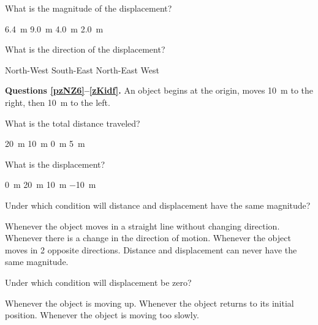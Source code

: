 \documentclass[answers]{exam}
\begin{document}
\begin{questions}
\ifprintanswers
\else
\clearpage
\fi

\question
What is the magnitude of the displacement?
\begin{randomizechoices}
    \correctchoice \SI{6.4}{m}
    \choice \SI{9.0}{m}
    \choice \SI{4.0}{m}
    \choice \SI{2.0}{m}
\end{randomizechoices}

\question \label{v2MdK}
What is the direction of the displacement?
\begin{randomizechoices}
    \correctchoice North-West
    \choice South-East
    \choice North-East
    \choice West
\end{randomizechoices}

\begin{EnvUplevel}
    \textbf{Questions \ref{pzNZ6}--\ref{zKidf}.} An object begins at the origin, moves \SI{10}{m} to the right, then \SI{10}{m} to the left.
\end{EnvUplevel}


\question \label{pzNZ6}
What is the total distance traveled?
\begin{randomizechoices}
    \correctchoice \SI{20}{m}
    \choice \SI{10}{m}
    \choice \SI{0}{m}
    \choice \SI{5}{m}
\end{randomizechoices}

\question \label{zKidf}
What is the displacement?
\begin{randomizechoices}
    \correctchoice \SI{0}{m}
    \choice \SI{20}{m}
    \choice \SI{10}{m}
    \choice \SI{-10}{m}
\end{randomizechoices}


\question
Under which condition will distance and displacement have the same magnitude?

\begin{randomizechoices}[keeplast]
    \correctchoice Whenever the object moves in a straight line without changing direction.
    \choice Whenever there is a change in the direction of motion.
    \choice Whenever the object moves in 2 opposite directions.
    \choice Distance and displacement can never have the same magnitude.
\end{randomizechoices}

\question
Under which condition will displacement be zero?

\begin{randomizechoices}
    \choice Whenever the object is moving up.
    \correctchoice Whenever the object returns to its initial position.
    \choice Whenever the object is moving too slowly.
\end{randomizechoices}


\end{questions}
\end{document}

